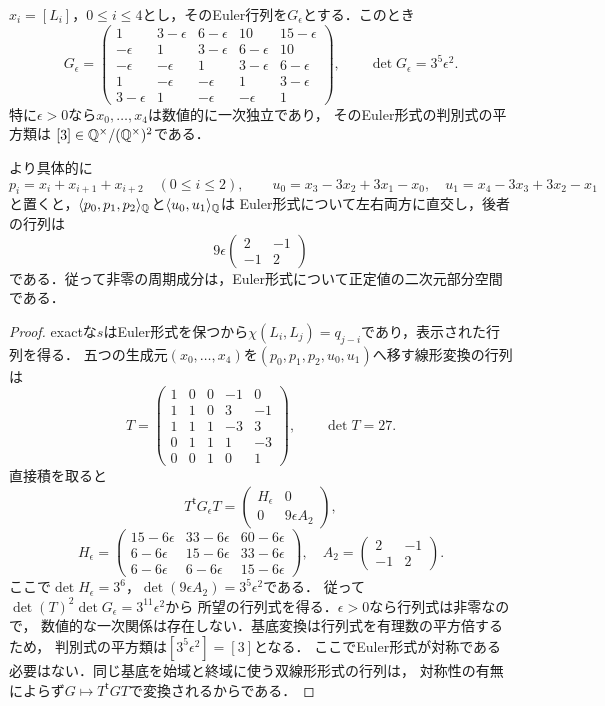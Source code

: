 \documentclass[11pt,a4paper]{ltjsarticle}
\begin{document}
\begin{lemma}
\label{lem:v10-period-three-discriminant}
$x_i=[L_i]$，$0\leq i\leq4$とし，そのEuler行列を$G_\epsilon$とする．このとき
\[
 G_\epsilon=
 \begin{pmatrix}
 1&3-\epsilon&6-\epsilon&10&15-\epsilon\\
 -\epsilon&1&3-\epsilon&6-\epsilon&10\\
 -\epsilon&-\epsilon&1&3-\epsilon&6-\epsilon\\
 1&-\epsilon&-\epsilon&1&3-\epsilon\\
 3-\epsilon&1&-\epsilon&-\epsilon&1
 \end{pmatrix},\qquad
 \det G_\epsilon=3^5\epsilon^2.
\]
特に$\epsilon>0$なら$x_0,\ldots,x_4$は数値的に一次独立であり，
そのEuler形式の判別式の平方類は
$[3]\in\mathbb Q^\times/(\mathbb Q^\times)^2$である．

より具体的に
\[
 p_i=x_i+x_{i+1}+x_{i+2}\quad(0\leq i\leq2),\qquad
 u_0=x_3-3x_2+3x_1-x_0,\quad
 u_1=x_4-3x_3+3x_2-x_1
\]
と置くと，$\langle p_0,p_1,p_2\rangle_\mathbb Q$と$\langle u_0,u_1\rangle_\mathbb Q$は
Euler形式について左右両方に直交し，後者の行列は
\[
 9\epsilon\begin{pmatrix}2&-1\\-1&2\end{pmatrix}
\]
である．従って非零の周期成分は，Euler形式について正定値の二次元部分空間である．
\end{lemma}
\begin{proof}
exactな$s$はEuler形式を保つから$\chi(L_i,L_j)=q_{j-i}$であり，表示された行列を得る．
五つの生成元$(x_0,\ldots,x_4)$を$(p_0,p_1,p_2,u_0,u_1)$へ移す線形変換の行列は
\[
 T=\begin{pmatrix}
 1&0&0&-1&0\\
 1&1&0&3&-1\\
 1&1&1&-3&3\\
 0&1&1&1&-3\\
 0&0&1&0&1
 \end{pmatrix},\qquad \det T=27.
\]
直接積を取ると
\[
 T^{\mathsf t}G_\epsilon T=
 \begin{pmatrix}H_\epsilon&0\\0&9\epsilon A_2\end{pmatrix},
\]
\[
 H_\epsilon=
 \begin{pmatrix}
 15-6\epsilon&33-6\epsilon&60-6\epsilon\\
 6-6\epsilon&15-6\epsilon&33-6\epsilon\\
 6-6\epsilon&6-6\epsilon&15-6\epsilon
 \end{pmatrix},
 \quad A_2=\begin{pmatrix}2&-1\\-1&2\end{pmatrix}.
\]
ここで$\det H_\epsilon=3^6$，$\det(9\epsilon A_2)=3^5\epsilon^2$である．
従って$\det(T)^2\det G_\epsilon=3^{11}\epsilon^2$から
所望の行列式を得る．$\epsilon>0$なら行列式は非零なので，
数値的な一次関係は存在しない．基底変換は行列式を有理数の平方倍するため，
判別式の平方類は$[3^5\epsilon^2]=[3]$となる．
ここでEuler形式が対称である必要はない．同じ基底を始域と終域に使う双線形形式の行列は，
対称性の有無によらず$G\mapsto T^{\mathsf t}GT$で変換されるからである．
\end{proof}
\end{document}
